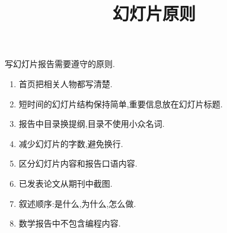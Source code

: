 \documentclass[a4paper]{book}
\makeatletter
\newcommand{\voidenvironment}[1]{%
\expandafter\providecommand\csname env@#1@save@env\endcsname{}%
\expandafter\providecommand\csname env@#1@process\endcsname{}%
\@ifundefined{#1}{}{\RenewEnviron{#1}{}}%
}
\numberwithin{equation}{chapter}
\theoremstyle{definition}
\makeatother
\begin{document}
\pagestyle{empty}




\setcounter{chapter}{0}




\title{幻灯片原则}
写幻灯片报告需要遵守的原则.
\begin{enumerate}
  \item 首页把相关人物都写清楚.
  \item 短时间的幻灯片结构保持简单,重要信息放在幻灯片标题.
  \item 报告中目录换提纲,目录不使用小众名词.
  \item 减少幻灯片的字数,避免换行.
  \item 区分幻灯片内容和报告口语内容.
  \item 已发表论文从期刊中截图.
  \item 叙述顺序:是什么,为什么,怎么做.
  \item 数学报告中不包含编程内容.
                                                                                                                                                                                                                          
\end{enumerate}
  
\end{document}
